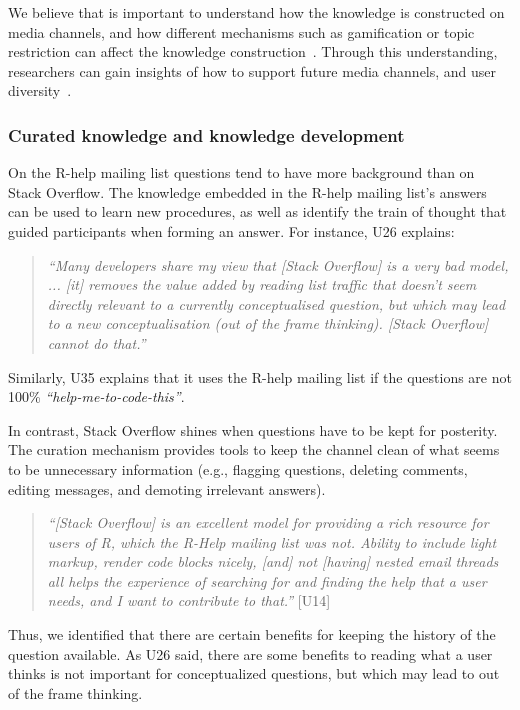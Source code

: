     We believe that is important to understand how the knowledge is constructed on media channels, and how different mechanisms such as gamification or topic restriction can affect the knowledge construction~\cite{Li2015}.
    Through this understanding, researchers can gain insights of how to support future media channels, and user diversity~\cite{Vasilescu2014b}.

\subsubsection{Curated knowledge and knowledge development}

    On the R-help mailing list questions tend to have more background than on Stack Overflow.
    The knowledge embedded in the R-help mailing list's answers can be used to learn new procedures, as well as identify the train of thought that guided participants when forming an answer.
    For instance, U26 explains:
    \begin{quote}
        \textit{``Many developers share my view that [Stack Overflow] is a very bad model, ... [it] removes the value added by reading list traffic that doesn't seem directly relevant to a currently conceptualised question, but which may lead to a new conceptualisation (out of the frame thinking). [Stack Overflow] cannot do that.''}
    \end{quote}
    Similarly, U35 explains that it uses the R-help mailing list if the questions are not 100\% \textit{``help-me-to-code-this''}.

    In contrast, Stack Overflow shines when questions have to be kept for posterity. 
    The curation mechanism provides tools to keep the channel clean of what seems to be unnecessary information (e.g., flagging questions, deleting comments, editing messages, and demoting irrelevant answers).

    \begin{quote}
        \textit{``[Stack Overflow] is an excellent model for providing a rich resource for users of R, which the R-Help mailing list was not. 
        Ability to include light markup, render code blocks nicely, [and] not [having] nested email threads all helps the experience of searching for and finding the help that a user needs, and I want to contribute to that.''} [U14]
    \end{quote}

    Thus, we identified that there are certain benefits for keeping the history of the question available.
    As U26 said, there are some benefits to reading what a user thinks is not important for conceptualized questions, but which may lead to out of the frame thinking. 

